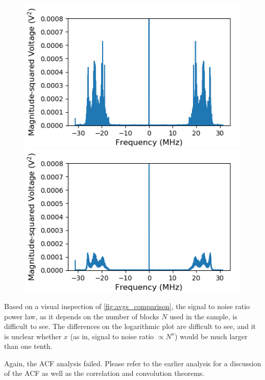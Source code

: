 \documentclass[a4paper]{article}
\begin{document}
\begin{figure}
\centering
\begin{minipage}{.5\textwidth}
	\centering
	\includegraphics[width=.9\linewidth]{5-7/pow1}
	\caption{}
	\label{fig:pow1}
\end{minipage}%
\begin{minipage}{.5\textwidth}
	\centering
	\includegraphics[width=.9\linewidth]{5-7/pow_all}
	\caption{}
	\label{fig:pow_all}
\end{minipage}
\end{figure}

Based on a visual inspection of \ref{fig:avgs_comparison}, the signal to noise ratio power law, as it depends on the number of blocks $N$ used in the sample, is difficult to see. The differences on the logarithmic plot are difficult to see, and it is unclear whether $x$ (as in, signal to noise ratio $\propto N^x$) would be much larger than one tenth. 

Again, the ACF analysis failed. Please refer to the earlier analysis for a discussion of the ACF as well as the correlation and convolution theorems.
\end{document}
